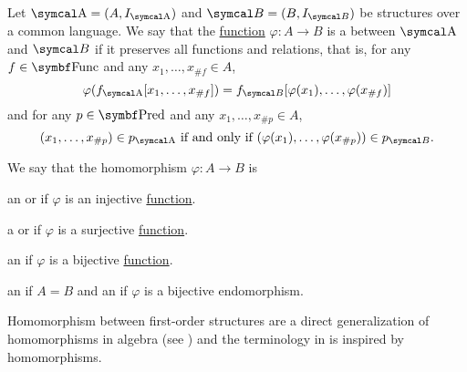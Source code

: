 \begin{definition}\label{def:first_order_homomorphism}\cite[definition 23.8]{OpenLogic20201202}
  Let \( \CA = (A, I_{\CA}) \) and \( \Cal{B} = (B, I_{\Cal{B}}) \) be structures over a common language. We say that the \hyperref[def:function]{function} \( \varphi: A \to B \) is a  between \( \CA \) and \( \Cal{B} \) if it preserves all functions and relations, that is, for any \( f \in \Cat{Func} \) and any \( x_1, \ldots, x_{\#f} \in A \),
  \begin{equation*}
    \varphi(f_{\CA}[x_1, \ldots, x_{\#f}]) = f_{\Cal{B}}[\varphi(x_1), \ldots, \varphi(x_{\#f})]
  \end{equation*}
  and for any \( p \in \Cat{Pred} \) and any \( x_1, \ldots, x_{\#p} \in A \),
  \begin{equation*}
    (x_1, \ldots, x_{\#p}) \in p_{\CA} \text{ if and only if } (\varphi(x_1), \ldots, \varphi(x_{\#p})) \in p_{\Cal{B}}.
  \end{equation*}

  We say that the homomorphism \( \varphi: A \to B \) is
  \begin{defenum}
     an  or  if \( \varphi \) is an injective \hyperref[def:function_invertibility/injection]{function}.

     a  or  if \( \varphi \) is a surjective \hyperref[def:function_invertibility/surjection]{function}.

     an  if \( \varphi \) is a bijective \hyperref[def:function_invertibility/bijection]{function}.

     an  if \( A = B \) and an  if \( \varphi \) is a bijective endomorphism.
  \end{defenum}

  Homomorphism between first-order structures are a direct generalization of homomorphisms in algebra (see ) and the terminology in  is inspired by homomorphisms.
\end{definition}

